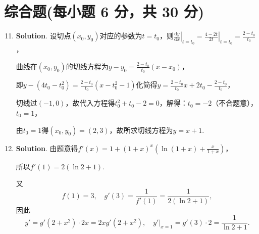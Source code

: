 \documentclass[../main.tex]{subfiles}
\begin{document}
\section{综合题(每小题 6 分，共 30 分)}
\begin{enumerate}
    \setcounter{enumi}{10}
    \item \textbf{Solution}. 设切点$(x_{0},y_{0})$对应的参数为$t=t_{0}$，则$\left
              .\frac{\mathrm{d}y}{\mathrm{d}x}\right|_{t=t_0}=\left.\frac{4-2t}{2t}\right
              |_{t=t_0}=\frac{2-t_{0}}{t_{0}}$，

          曲线在$(x_{0},y_{0})$的切线方程为$y-y_{0}=\frac{2-t_{0}}{t_{0}}(x-x_{0})$，

          即$y-(4t_{0}-t_{0}^{2})=\frac{2-t_{0}}{t_{0}}(x-t_{0}^{2}-1)$化简得$y=\frac{2-t_{0}}{t_{0}}
              x+2t_{0}-\frac{2-t_{0}}{t_{0}}$，

          切线过$(-1,0)$，故代入方程得$t_{0}^{2}+t_{0}-2=0$，解得：$t_{0}=-2$（不合题意），$t
                  _{0}=1$，

          由$t_{0}=1$得$(x_{0},y_{0})=(2,3)$，故所求切线方程为$y=x+1$.

    \item \textbf{Solution}. 由题意得$f'(x)=1+(1+x)^{x}\left(\ln(1+x)+\frac{x}{1+x}
              \right)$，

          所以$f'(1)=2(\ln2+1)$.

          又
          \[
              f(1)=3,\quad g'(3)=\frac{1}{f'(1)}=\frac{1}{2(\ln2+1)},
          \]
          因此
          \[
              y'=g'(2+x^{2})\cdot 2x=2xg'(2+x^{2}),\quad\left.y'\right|_{x=1}=g'(3)\cdot2=
              \frac{1}{\ln2+1}.
          \]


\end{enumerate}
\end{document}
